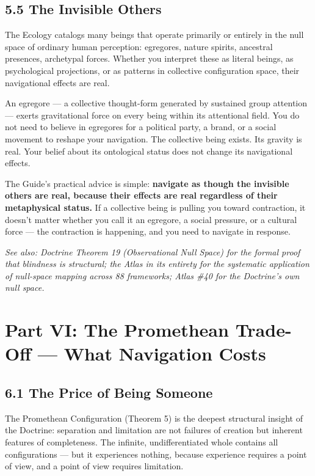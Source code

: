\subsection*{5.5 The Invisible Others}


The Ecology catalogs many beings that operate primarily or entirely in the null space of ordinary human perception: egregores, nature spirits, ancestral presences, archetypal forces. Whether you interpret these as literal beings, as psychological projections, or as patterns in collective configuration space, their navigational effects are real.


An egregore — a collective thought-form generated by sustained group attention — exerts gravitational force on every being within its attentional field. You do not need to believe in egregores for a political party, a brand, or a social movement to reshape your navigation. The collective being exists. Its gravity is real. Your belief about its ontological status does not change its navigational effects.


The Guide's practical advice is simple: \textbf{navigate as though the invisible others are real, because their effects are real regardless of their metaphysical status.} If a collective being is pulling you toward contraction, it doesn't matter whether you call it an egregore, a social pressure, or a cultural force — the contraction is happening, and you need to navigate in response.


\textit{See also: Doctrine Theorem 19 (Observational Null Space) for the formal proof that blindness is structural; the Atlas in its entirety for the systematic application of null-space mapping across 88 frameworks; Atlas \#40 for the Doctrine's own null space.}


\bigskip\noindent\makebox[\textwidth]{\color{rulegray}\rule{5cm}{0.3pt}}\bigskip


\section*{Part VI: The Promethean Trade-Off — What Navigation Costs}


\subsection*{6.1 The Price of Being Someone}


The Promethean Configuration (Theorem 5) is the deepest structural insight of the Doctrine: separation and limitation are not failures of creation but inherent features of completeness. The infinite, undifferentiated whole contains all configurations — but it experiences nothing, because experience requires a point of view, and a point of view requires limitation.


